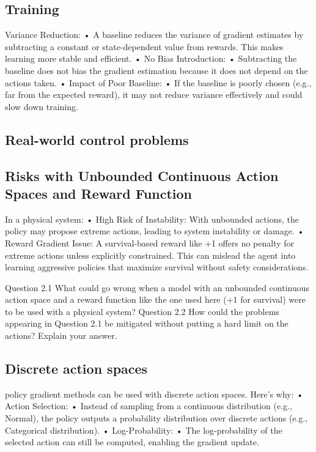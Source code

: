 \documentclass{article}
\begin{document}
\subsection{Training}
Variance Reduction:
•	A baseline reduces the variance of gradient estimates by subtracting a constant or state-dependent value from rewards. This makes learning more stable and efficient.
•	No Bias Introduction:
•	Subtracting the baseline does not bias the gradient estimation because it does not depend on the actions taken.
•	Impact of Poor Baseline:
•	If the baseline is poorly chosen (e.g., far from the expected reward), it may not reduce variance effectively and could slow down training.


\subsection{Real-world control problems}

\subsection{Risks with Unbounded Continuous Action Spaces and Reward Function}
In a physical system:
•	High Risk of Instability: With unbounded actions, the policy may propose extreme actions, leading to system instability or damage.
•	Reward Gradient Issue: A survival-based reward like +1 offers no penalty for extreme actions unless explicitly constrained. This can mislead the agent into learning aggressive policies that maximize survival without safety considerations.

Question 2.1 What could go wrong when a model with an unbounded continuous action space and a
reward function like the one used here (+1 for survival) were to be used with a physical system?
Question 2.2 How could the problems appearing in Question 2.1 be mitigated without putting a hard limit
on the actions? Explain your answer.

\subsection{Discrete action spaces}
policy gradient methods can be used with discrete action spaces. Here’s why:
•	Action Selection:
•	Instead of sampling from a continuous distribution (e.g., Normal), the policy outputs a probability distribution over discrete actions (e.g., Categorical distribution).
•	Log-Probability:
•	The log-probability of the selected action can still be computed, enabling the gradient update.
\end{document}
